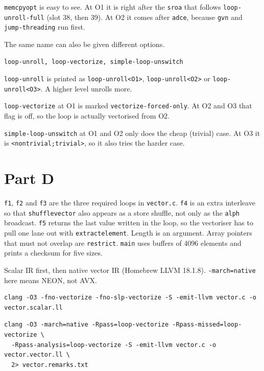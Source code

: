 \documentclass[11pt,a4paper]{article}
\begin{document}
\texttt{memcpyopt} is easy to see. At O1 it is right after the
\texttt{sroa} that follows \texttt{loop-unroll-full} (slot 38, then
39). At O2 it comes after \texttt{adce}, because \texttt{gvn} and
\texttt{jump-threading} run first.

The same name can also be given different options.

\begin{lstlisting}[language={}]
loop-unroll, loop-vectorize, simple-loop-unswitch
\end{lstlisting}

\texttt{loop-unroll} is printed as \texttt{loop-unroll<O1>},
\texttt{loop-unroll<O2>} or \texttt{loop-unroll<O3>}. A higher
level unrolls more.

\texttt{loop-vectorize} at O1 is marked
\texttt{vectorize-forced-only}. At O2 and O3 that flag is off, so
the loop is actually vectorised from O2.

\texttt{simple-loop-unswitch} at O1 and O2 only does the cheap
(trivial) case. At O3 it is
\texttt{<nontrivial;trivial>}, so it also tries the harder case.

\section{Part D}

\texttt{f1}, \texttt{f2} and \texttt{f3} are the three required loops
in \texttt{vector.c}. \texttt{f4} is an extra interleave so that
\texttt{shufflevector} also appears as a store shuffle, not only as the
\texttt{alph} broadcast. \texttt{f5} returns the last value written in
the loop, so the vectoriser has to pull one lane out with
\texttt{extractelement}. Length is an argument. Array pointers
that must not overlap are \texttt{restrict}. \texttt{main} uses buffers
of 4096 elements and prints a checksum for five sizes.

Scalar IR first, then native vector IR (Homebrew LLVM 18.1.8).
\texttt{-march=native} here means NEON, not AVX.

\begin{lstlisting}[language={},basicstyle=\ttfamily\footnotesize]
clang -O3 -fno-vectorize -fno-slp-vectorize -S -emit-llvm vector.c -o vector.scalar.ll
\end{lstlisting}

\begin{lstlisting}[language={},basicstyle=\ttfamily\footnotesize]
clang -O3 -march=native -Rpass=loop-vectorize -Rpass-missed=loop-vectorize \
  -Rpass-analysis=loop-vectorize -S -emit-llvm vector.c -o vector.vector.ll \
  2> vector.remarks.txt
\end{lstlisting}
\end{document}
